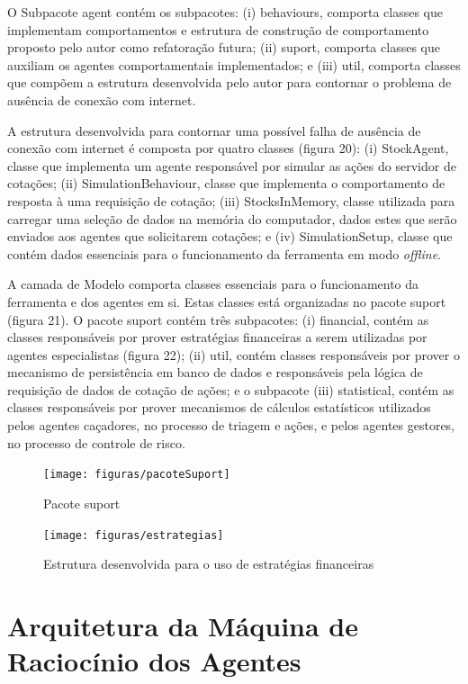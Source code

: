 O Subpacote agent contém os subpacotes: (i) behaviours, comporta classes que implementam comportamentos e estrutura de construção de comportamento proposto pelo autor como refatoração futura; (ii) suport, comporta classes que auxiliam os agentes comportamentais implementados; e (iii) util, comporta classes que compõem a estrutura desenvolvida pelo autor para contornar o problema de ausência de conexão com internet. 

A estrutura desenvolvida para contornar uma possível falha de ausência de conexão com internet é composta por quatro classes (figura 20): (i) StockAgent, classe que implementa um agente responsável por simular as ações do servidor de cotações; (ii) SimulationBehaviour, classe que implementa o comportamento de resposta à uma requisição de cotação; (iii) StocksInMemory, classe utilizada para carregar uma seleção de dados na memória do computador, dados estes que serão enviados aos agentes que solicitarem cotações; e (iv) SimulationSetup, classe que contém dados essenciais para o funcionamento da ferramenta em modo \textit{offline}.

A camada de Modelo comporta classes  essenciais para o funcionamento da ferramenta e dos agentes em si. Estas classes está organizadas no pacote suport (figura 21). O pacote suport contém três subpacotes: (i) financial, contém as classes responsáveis por prover estratégias financeiras a serem utilizadas por agentes especialistas (figura 22); (ii) util, contém classes responsáveis por prover o mecanismo de persistência em banco de dados e responsáveis pela lógica de requisição de dados de cotação de ações; e o subpacote (iii) statistical, contém as classes responsáveis por prover mecanismos de cálculos estatísticos utilizados pelos agentes caçadores, no processo de triagem e ações, e pelos agentes gestores, no processo de controle de risco.   

\begin{figure}[h]
\centering
\label{f21}
\texttt{[image: figuras/pacoteSuport]}
\caption{Pacote suport}
\end{figure}


\begin{figure}[h]
\centering
\label{f22}
\texttt{[image: figuras/estrategias]}
\caption{Estrutura desenvolvida para o uso de estratégias financeiras}
\end{figure}
\FloatBarrier

\section{Arquitetura da Máquina de Raciocínio dos Agentes}

